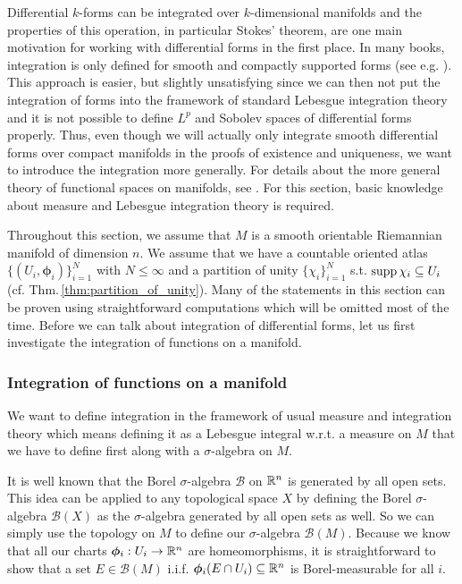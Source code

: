 \documentclass[../master_thesis.tex]{subfiles}
\begin{document}
Differential $k$-forms can be integrated over $k$-dimensional manifolds and 
the properties of this operation, in particular Stokes' theorem, are one main motivation for working with differential 
forms in the first place. In many books, integration is only defined for 
smooth and compactly supported forms (see e.g. \cite[Sec.\,V.3]{topology_and_geometry}). This approach is easier, 
but slightly unsatisfying since we can then not put the integration of forms 
into the framework of standard Lebesgue integration theory and it is not possible 
to define $L^p$ and Sobolev spaces of differential forms properly. Thus, even though we will
actually only integrate smooth differential forms over compact manifolds in the proofs
of existence and uniqueness,
we want to introduce the integration more generally. For details about the 
more general theory of functional spaces on manifolds, see \cite[Sec.\,10.2.4]{nicolaescu}.
For this section, basic knowledge about measure and Lebesgue integration theory is required. 

Throughout this section, we assume that $M$ is a smooth orientable Riemannian 
manifold of dimension $n$. We assume that we have a 
countable oriented atlas $\{ (U_i, \boldsymbol{\phi}_i) \}_{i=1}^N$ with $N \leq \infty$ 
and a partition of unity $\{\chi_i\}_{i=1}^N$ s.t. $\operatorname{supp} \chi_i \subseteq U_i$
(cf. Thm.\,\ref{thm:partition_of_unity}).
Many of the statements in this section can be proven using straightforward computations 
which will be omitted most of the time.
Before we can talk about integration of differential forms, let us first 
investigate the integration of functions on a manifold.

\subsubsection{Integration of functions on a manifold}

We want to define integration in the framework of usual measure and integration
theory which means defining it as a Lebesgue integral w.r.t. a measure on $M$
that we have to define first along with a $\sigma$-algebra on $M$. 

It is well known that
the Borel $\sigma$-algebra $\mathcal{B}$ on $\mathbb{R}^n$ is generated
by all open sets. This idea can be applied to any topological space $X$ by 
defining the Borel $\sigma$-algebra $\mathcal{B}(X)$ as the $\sigma$-algebra 
generated by all open sets as well. So we can simply use the topology on $M$ to define 
our $\sigma$-algebra $\mathcal{B}(M)$. Because we know that all our 
charts $\boldsymbol{\phi}_i: U_i \rightarrow \mathbb{R}^n$ are homeomorphisms, it is 
straightforward to show that a set $E \in \mathcal{B}(M)$ i.i.f.
$\boldsymbol{\phi}_i(E \cap U_i) \subseteq \mathbb{R}^n$ is Borel-measurable for all $i$. 
\end{document}

